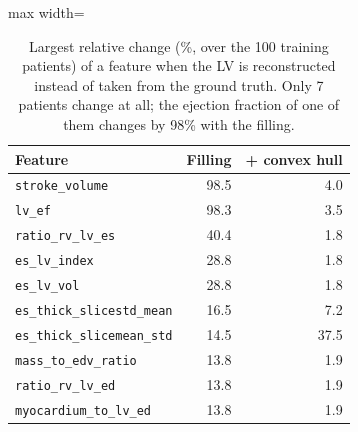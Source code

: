 \begin{table}[H]
\centering
\small
\setlength{\tabcolsep}{4pt}
\begin{adjustbox}{max width=\linewidth}
\begin{tabular}{lrr}
\toprule
Feature & Filling & + convex hull \\
\midrule
\texttt{stroke\_volume} & 98.5 & 4.0 \\
\texttt{lv\_ef} & 98.3 & 3.5 \\
\texttt{ratio\_rv\_lv\_es} & 40.4 & 1.8 \\
\texttt{es\_lv\_index} & 28.8 & 1.8 \\
\texttt{es\_lv\_vol} & 28.8 & 1.8 \\
\texttt{es\_thick\_slicestd\_mean} & 16.5 & 7.2 \\
\texttt{es\_thick\_slicemean\_std} & 14.5 & 37.5 \\
\texttt{mass\_to\_edv\_ratio} & 13.8 & 1.9 \\
\texttt{ratio\_rv\_lv\_ed} & 13.8 & 1.9 \\
\texttt{myocardium\_to\_lv\_ed} & 13.8 & 1.9 \\
\bottomrule
\end{tabular}
\end{adjustbox}
\caption{Largest relative change (\%, over the 100 training patients) of a feature when the LV is reconstructed instead of taken from the ground truth. Only 7 patients change at all; the ejection fraction of one of them changes by 98\% with the filling.}
\label{tab:supp-shift}
\end{table}
